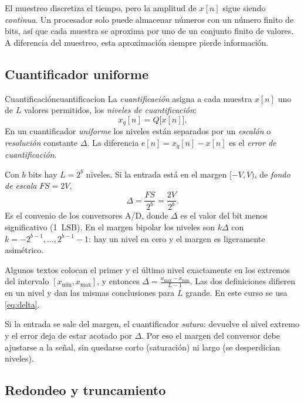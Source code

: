 \documentclass[11pt,a4paper]{scrartcl}
\begin{document}
El muestreo discretiza el tiempo, pero la amplitud de $x[n]$ sigue siendo \emph{continua}. Un procesador solo puede almacenar números con un número finito de bits, así que cada muestra se aproxima por uno de un conjunto finito de valores. A diferencia del muestreo, esta aproximación siempre pierde información.

\subsection{Cuantificador uniforme}

\begin{definicion}{Cuantificación}{cuantificacion}
  La \emph{cuantificación} asigna a cada muestra $x[n]$ uno de $L$ valores permitidos, los \emph{niveles de cuantificación}:
  \[
    x_q[n]=Q\big[x[n]\big].
  \]
  En un cuantificador \emph{uniforme} los niveles están separados por un \emph{escalón} o \emph{resolución} constante $\Delta$. La diferencia $e[n]=x_q[n]-x[n]$ es el \emph{error de cuantificación}.
\end{definicion}

Con $b$ bits hay $L=2^b$ niveles. Si la entrada está en el margen $[-V,V)$, de \emph{fondo de escala} $FS=2V$,
\begin{equation}\label{eq:delta}
  \Delta=\frac{FS}{2^b}=\frac{2V}{2^b}.
\end{equation}
Es el convenio de los conversores A/D, donde $\Delta$ es el valor del bit menos significativo (1~LSB). En el margen bipolar los niveles son $k\Delta$ con $k=-2^{b-1},\dots,2^{b-1}-1$: hay un nivel en cero y el margen es ligeramente asimétrico.

\begin{nota}
  Algunos textos colocan el primer y el último nivel exactamente en los extremos del intervalo $[x_{\min},x_{\max}]$, y entonces $\Delta=\frac{x_{\max}-x_{\min}}{L-1}$. Las dos definiciones difieren en un nivel y dan las mismas conclusiones para $L$ grande. En este curso se usa \eqref{eq:delta}.
\end{nota}

Si la entrada se sale del margen, el cuantificador \emph{satura}: devuelve el nivel extremo y el error deja de estar acotado por $\Delta$. Por eso el margen del conversor debe ajustarse a la señal, sin quedarse corto (saturación) ni largo (se desperdician niveles).

\subsection{Redondeo y truncamiento}
\end{document}

